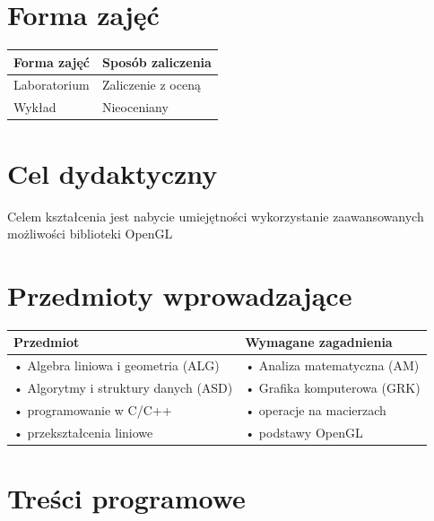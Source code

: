 \documentclass[12pt, a4paper]{article}
\begin{document}
\section{Forma zajęć}

\begin{tabular}{ll}
  \hline
  \textbf{Forma zajęć} & \textbf{Sposób zaliczenia} \\
  \hline
  Laboratorium & Zaliczenie z oceną \\
  Wykład & Nieoceniany \\
  \hline
\end{tabular}

\section{Cel dydaktyczny}

Celem kształcenia jest nabycie umiejętności wykorzystanie zaawansowanych możliwości biblioteki OpenGL

\section{Przedmioty wprowadzające}

\begin{tabularx}{\textwidth}{lX}
  \hline
  \textbf{Przedmiot} & \textbf{Wymagane zagadnienia} \\
  \hline
  • Algebra liniowa i geometria  (ALG) & • Analiza matematyczna  (AM) \\
  • Algorytmy i struktury danych (ASD) & • Grafika komputerowa (GRK) \\
  • programowanie w C/C++ & • operacje na macierzach \\
  • przekształcenia liniowe & • podstawy OpenGL \\
  \hline
\end{tabularx}

\section{Treści programowe}
\end{document}

